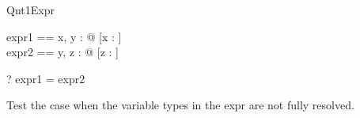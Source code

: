 \begin{zsection}
  \SECTION Qnt1Expr
\end{zsection}

\begin{zed}
  expr1 == \exists x, y : \nat @ [x : \nat]\\
  expr2 == \exists y, z : \nat @ [z : \nat]\\
\end{zed}

\begin{zed} \vdash? expr1 = expr2 \end{zed}

Test the case when the variable types in the expr are not fully 
resolved.

